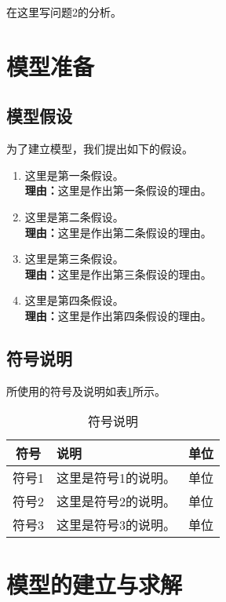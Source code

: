 \documentclass[12pt, a4paper, oneside]{ctexart}
\begin{document}
在这里写问题2的分析。

\section{模型准备}

\subsection{模型假设}

为了建立模型，我们提出如下的假设。

\begin{enumerate}
    \item 这里是第一条假设。
    \\\textbf{理由：}这里是作出第一条假设的理由。
    \item 这里是第二条假设。
    \\\textbf{理由：}这里是作出第二条假设的理由。
    \item 这里是第三条假设。
    \\\textbf{理由：}这里是作出第三条假设的理由。
    \item 这里是第四条假设。
    \\\textbf{理由：}这里是作出第四条假设的理由。
\end{enumerate}

\subsection{符号说明}

所使用的符号及说明如表\ref{table1}所示。

\begin{table}[ht]
    \caption{符号说明}\label{table1}
    \centering
    \begin{tabular}{c l c}
        \hline
        \textbf{符号} & \textbf{说明}        & \textbf{单位}   \\ \hline
        符号1         & 这里是符号1的说明。  & 单位             \\
        符号2         & 这里是符号2的说明。  & 单位             \\
        符号3         & 这里是符号3的说明。  & 单位             \\ \hline
    \end{tabular}
\end{table}

\section{模型的建立与求解}
\end{document}
